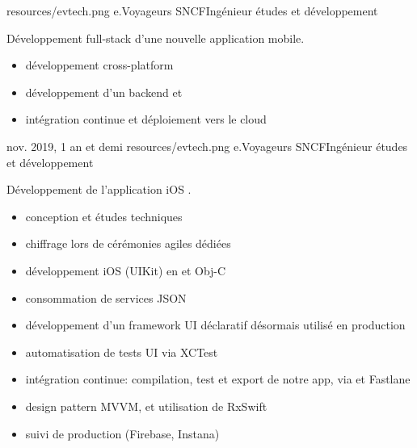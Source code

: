 \documentclass{cv}
\begin{document}

{resources/evtech.png}
{e.Voyageurs SNCF}{Ingénieur études et développement}{

Développement full-stack d'une nouvelle application mobile.

\begin{itemize}
	\item développement cross-platform 
	\item développement d'un backend  et 
	\item intégration continue et déploiement vers le cloud 
\end{itemize}
}

\experience
{{nov. 2019,  1 an et demi}}
{resources/evtech.png}
{e.Voyageurs SNCF}{Ingénieur études et développement}{

Développement de l'application iOS \href{https://apps.apple.com/fr/app/oui-sncf-train-et-bus/id343889987}{\link{\ouisncf{}}}.

\begin{itemize}
	\item conception et études techniques
	\item chiffrage lors de cérémonies agiles dédiées
	\item développement iOS (UIKit) en  et Obj-C
	\item consommation de services JSON
	\item développement d'un framework UI déclaratif désormais utilisé en production
	\item automatisation de tests UI via XCTest
	\item intégration continue: compilation, test et export de notre app, via  et Fastlane
	\item design pattern MVVM, et utilisation de RxSwift
	\item suivi de production (Firebase, Instana)
\end{itemize}
}
\end{document}
